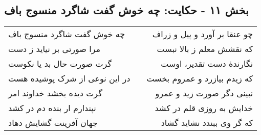 \begin{center}
\section*{بخش ۱۱ - حکایت: چه خوش گفت شاگرد منسوج باف}
\label{sec:011}
\begin{longtable}{l p{0.5cm} r}
چه خوش گفت شاگرد منسوج باف
&&
چو عنقا بر آورد و پیل و زراف
\\
مرا صورتی بر نیاید ز دست
&&
که نقشش معلم ز بالا نبست
\\
گرت صورت حال بد یا نکوست
&&
نگارندهٔ دست تقدیر، اوست
\\
در این نوعی از شرک پوشیده هست
&&
که زیدم بیازرد و عمروم بخست
\\
گرت دیده بخشد خداوند امر
&&
نبینی دگر صورت زید و عمرو
\\
نپندارم ار بنده دم در کشد
&&
خدایش به روزی قلم در کشد
\\
جهان آفرینت گشایش دهاد
&&
که گر وی ببندد نشاید گشاد
\\
\end{longtable}
\end{center}
